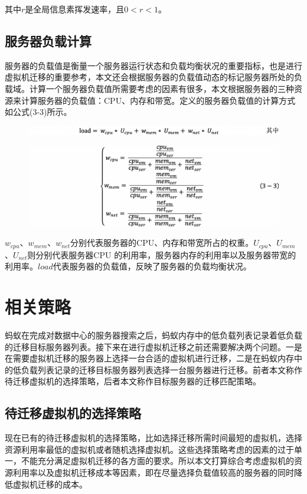 其中$ r $是全局信息素挥发速率，且$ 0 < r < 1$。

\subsection{服务器负载计算}
 服务器的负载值是衡量一个服务器运行状态和负载均衡状况的重要指标，也是进行虚拟机迁移的重要参考，本文还会根据服务器的负载值动态的标记服务器所处的负载域。计算一个服务器负载值所需要考虑的因素有很多，本文根据服务器的三种资源来计算服务器的负载值：CPU、内存和带宽。定义的服务器负载值的计算方式如公式(3-3)所示。

 \begin{figure}[htb]
  \centering
  \includegraphics[width=0.95\linewidth]{./Figure/IMG_Chap3_7.png}
\end{figure}

 \begin{figure}[htb]
  \centering
  \includegraphics[width=0.95\linewidth]{./Figure/IMG_Chap3_8.png}
\end{figure}

$ w_{cpu} $、$ w_{mem} $、$ w_{net} $分别代表服务器的CPU、内存和带宽所占的权重。$ U_{cpu} $、$ U_{mem} $、$ U_{net} $则分别代表服务器CPU 的利用率，服务器内存的利用率以及服务器带宽的利用率。$ load $代表服务器的负载值，反映了服务器的负载均衡状况。

\section{相关策略}
蚂蚁在完成对数据中心的服务器搜索之后，蚂蚁内存中的低负载列表记录着低负载的迁移目标服务器列表。接下来在进行虚拟机迁移之前还需要解决两个问题。一是在需要虚拟机迁移的服务器上选择一台合适的虚拟机进行迁移，二是在蚂蚁内存中的低负载列表记录的迁移目标服务器列表选择一台服务器进行迁移。前者本文称作待迁移虚拟机的选择策略，后者本文称作目标服务器的迁移匹配策略。

\subsection{待迁移虚拟机的选择策略}
现在已有的待迁移虚拟机的选择策略，比如选择迁移所需时间最短的虚拟机，选择资源利用率最低的虚拟机或者随机选择虚拟机。这些选择策略考虑的因素的过于单一，不能充分满足虚拟机迁移的各方面的要求。所以本文打算综合考虑虚拟机的资源利用率以及虚拟机迁移成本等因素，即在尽量选择负载值较高的服务器的同时降低虚拟机迁移的成本。

